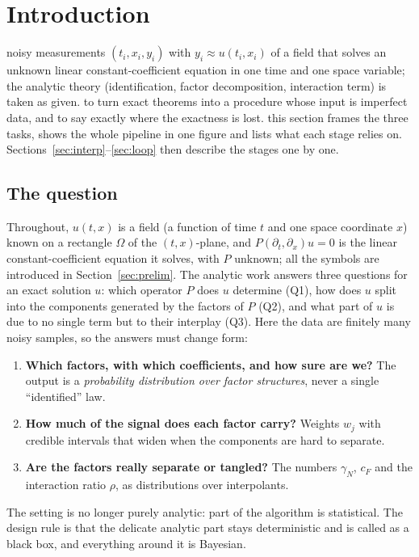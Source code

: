 \section{Introduction}\label{sec:intro}
\sectionbrief
{noisy measurements $(t_i,x_i,y_i)$ with $y_i\approx u(t_i,x_i)$ of a field that solves an unknown linear constant-coefficient equation in one time and one space variable; the analytic theory (identification, factor decomposition, interaction term) is taken as given.}
{to turn exact theorems into a procedure whose input is imperfect data, and to say exactly where the exactness is lost.}
{this section frames the three tasks, shows the whole pipeline in one figure and lists what each stage relies on. Sections~\ref{sec:interp}--\ref{sec:loop} then describe the stages one by one.}

\subsection{The question}
Throughout, $u(t,x)$ is a field (a function of time $t$ and one space coordinate $x$) known on a rectangle $\Omega$ of the $(t,x)$-plane, and $P(\partial_t,\partial_x)u=0$ is the linear constant-coefficient equation it solves, with $P$ unknown; all the symbols are introduced in Section~\ref{sec:prelim}. The analytic work answers three questions for an exact solution $u$: which operator $P$ does $u$ determine (Q1), how does $u$ split into the components generated by the factors of $P$ (Q2), and what part of $u$ is due to no single term but to their interplay (Q3). Here the data are finitely many noisy samples, so the answers must change form:
\begin{enumerate}[label=\textbf{A\arabic*.},leftmargin=1.1cm,nosep]
\item \textbf{Which factors, with which coefficients, and how sure are we?} The output is a \emph{probability distribution over factor structures}, never a single ``identified'' law.
\item \textbf{How much of the signal does each factor carry?} Weights $w_j$ with credible intervals that widen when the components are hard to separate.
\item \textbf{Are the factors really separate or tangled?} The numbers $\gamma_N$, $c_F$ and the interaction ratio $\rho$, as distributions over interpolants.
\end{enumerate}
The setting is no longer purely analytic: part of the algorithm is statistical. The design rule is that the delicate analytic part stays deterministic and is called as a black box, and everything around it is Bayesian.

